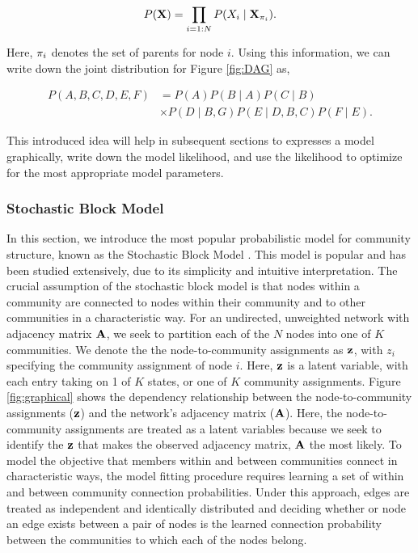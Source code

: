 \begin{equation}
P({\bf X})=\prod_{i=1:N}P(X_{i} \mid {\bf X}_{\pi_{i}}).
\end{equation}

Here, ${\bf \pi}_{i}$ denotes the set of parents for node $i$. Using this information, we can write down the joint distribution for Figure \ref{fig:DAG} as,

\begin{equation}
\begin{split}
P(A,B,C,D,E,F)&=P(A)P(B\mid A)P(C\mid B)\\
&\times P(D \mid B,G)P(E \mid D,B,C)P(F\mid E).
\end{split}
\end{equation}

This introduced idea will help in subsequent sections to expresses a model graphically, write down the model likelihood, and use the likelihood to optimize for the most appropriate model parameters. 

\subsubsection{Stochastic Block Model}
In this section, we introduce the most popular  probabilistic model for community structure, known as the Stochastic Block Model \cite{sbmorig}. This model is popular and has been studied extensively, due to its simplicity and intuitive interpretation. The crucial assumption of the stochastic block model is that nodes within a community are connected to nodes within their community and to other communities in a characteristic way. For an undirected, unweighted network with adjacency matrix ${\bf A}$, we seek to partition each of the $N$ nodes into one of $K$ communities. We denote the the node-to-community assignments as ${\bf z}$, with $z_{i}$ specifying the community assignment of node $i$. Here, ${\bf z}$ is a latent variable, with each entry taking on 1 of $K$ states, or one of $K$ community assignments. Figure \ref{fig:graphical} shows the dependency relationship between the node-to-community assignments (${\bf z}$) and the network's adjacency matrix (${\bf A}$). Here, the node-to-community assignments are treated as a latent variables because we seek to identify the ${\bf z}$ that makes the observed adjacency matrix, ${\bf A}$ the most likely. To model the objective that members within and between communities connect in characteristic ways, the model fitting procedure requires learning a set of within and between community connection probabilities. Under this approach, edges are treated as independent and identically distributed and deciding whether or node an edge exists between a pair of nodes is the learned connection probability between the communities to which each of the nodes belong.

